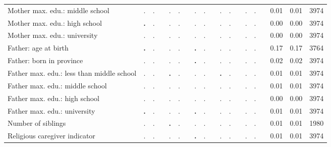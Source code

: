 \begin{tabular}{l c c c c c c c c c c c c c c c c c c}
Mother max. edu.: middle school &         . &         . & &         . &         . & &         . &         . & &         . &         . & &         . &         . & &      0.01 &      0.01 &      3974 \\
Mother max. edu.: high school & \textbf{        .} &         . & &         . &         . & &         . &         . & &         . &         . & &         . &         . & &      0.00 &      0.00 &      3974 \\
Mother max. edu.: university &         . &         . & &         . &         . & &         . &         . & &         . &         . & &         . &         . & &      0.00 &      0.00 &      3974 \\
Father: age at birth & \textbf{        .} &         . & &         . &         . & & \textbf{        .} &         . & &         . &         . & &         . &         . & &      0.17 &      0.17 &      3764 \\
Father: born in province &         . &         . & &         . &         . & & \textbf{        .} &         . & &         . &         . & &         . &         . & &      0.02 &      0.02 &      3974 \\
Father max. edu.: less than middle school &         . &         . & & \textbf{        .} &         . & &         . &         . & & \textbf{        .} &         . & &         . &         . & &      0.01 &      0.01 &      3974 \\
Father max. edu.: middle school &         . &         . & &         . &         . & &         . &         . & &         . &         . & &         . &         . & &      0.01 &      0.01 &      3974 \\
Father max. edu.: high school &         . &         . & &         . &         . & &         . &         . & &         . &         . & &         . &         . & &      0.00 &      0.00 &      3974 \\
Father max. edu.: university & \textbf{        .} &         . & &         . &         . & & \textbf{        .} &         . & &         . &         . & &         . &         . & &      0.01 &      0.01 &      3974 \\
Number of siblings &         . &         . & & \textbf{        .} &         . & &         . &         . & &         . &         . & &         . &         . & &      0.01 &      0.01 &      1980 \\
Religious caregiver indicator &         . &         . & &         . &         . & & \textbf{        .} &         . & &         . &         . & &         . &         . & &      0.01 &      0.01 &      3974 \\

\end{tabular}
